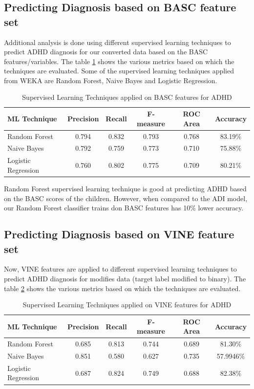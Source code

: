 \subsection{Predicting Diagnosis based on BASC feature set}
Additional analysis is done using different supervised learning techniques to predict ADHD diagnosis for our converted data based on the BASC features/variables. The table \ref{table:611} shows the various metrics based on which the techniques are evaluated. Some of the supervised learning techniques applied from WEKA are Random Forest, Naive Bayes and Logistic Regression.
\begin{table}[h]
\begin{center}
\begin{tabular}{|l|c|c|c|c|c|}
\hline
\textbf{ML Technique}&	\textbf{Precision}&	\textbf{Recall}&	\textbf{F-measure}&	\textbf{ROC Area}&	\textbf{Accuracy}\\
\hline \hline
Random Forest&0.794&	0.832&	0.793&	0.768&	83.19\%\\
\hline
Naive Bayes&0.792&	0.759&	0.773&	0.710&	75.88\%\\
\hline
Logistic Regression	&0.760&	0.802&	0.775&	0.709&	80.21\%\\
\hline
\end{tabular}
\end{center}
\caption{Supervised Learning Techniques applied on BASC features for ADHD }
\label{table:611}
\end{table}

Random Forest supervised learning technique is good at predicting ADHD based on the BASC scores of the children. However, when compared to the ADI model, our Random Forest classifier trains don BASC features has 10\% lower accuracy.

\subsection{Predicting Diagnosis based on VINE feature set}
Now, VINE features are applied to different supervised learning techniques to predict ADHD diagnosis for modifies data (target label modified to binary). The table \ref{table:612} shows the various metrics based on which the techniques are evaluated.

\begin{table}[h]
\begin{center}
\begin{tabular}{|l|c|c|c|c|c|}
\hline
\textbf{ML Technique}&	\textbf{Precision}&	\textbf{Recall}&	\textbf{F-measure}&	\textbf{ROC Area}&	\textbf{Accuracy}\\
\hline \hline
Random Forest&0.685&	0.813&	0.744&	0.689&	81.30\%\\
\hline
Naive Bayes&0.851&	0.580&	0.627&	0.735	&57.9946\%\\
\hline
Logistic Regression	&0.687&	0.824&	0.749&	0.688&	82.38\%\\
\hline
\end{tabular}
\end{center}
\caption{Supervised Learning Techniques applied on VINE features for ADHD }
\label{table:612}
\end{table}

